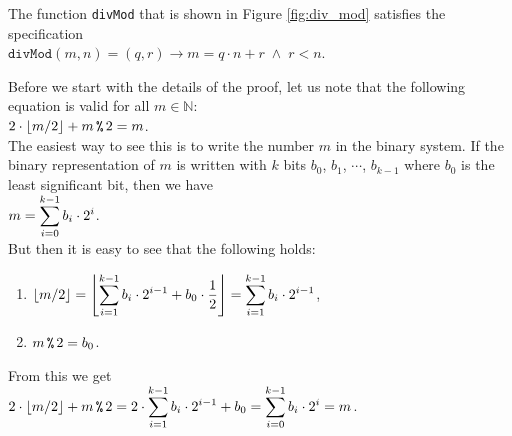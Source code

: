 \exampleEng
The function \texttt{divMod} that is shown in Figure \ref{fig:div_mod} satisfies the specification
\\[0.2cm]
\hspace*{1.3cm}
$\mathtt{divMod}(m, n) = (q, r)  \rightarrow m = q \cdot n + r \;\wedge\; r < n$. \eox



\proof
Before we start with the details of the proof, let us note that the following equation is valid for all $m\in\mathbb{N}$:
\\[0.2cm]
\hspace*{1.3cm}
$2 \cdot \lfloor m / 2 \rfloor + m \,\texttt{\%}\, 2 = m$.
\\[0.2cm]
The easiest way to see this is to write the number $m$ in the binary system.  If the binary representation of
$m$ is written with $k$ bits $b_0$, $b_1$, $\cdots$, $b_{k-1}$ where $b_0$ is the least significant bit, then we have
\\[0.2cm]
\hspace*{1.3cm}
$\displaystyle m = \sum\limits_{i=0}^{k-1} b_i \cdot 2^i$.
\\[0.2cm] 
But then it is easy to see that the following holds:
\begin{enumerate}
\item $\displaystyle \lfloor m / 2 \rfloor =
         \left\lfloor\sum\limits_{i=1}^{k-1} b_i \cdot 2^{i-1} + b_0 \cdot\frac{1}{2}\right\rfloor = 
         \sum\limits_{i=1}^{k-1} b_i \cdot 2^{i-1} $,
\item $m \,\texttt{\%}\, 2 = b_0$.
\end{enumerate}
From this we get
\\[0.2cm]
\hspace*{1.3cm}
$\displaystyle 2 \cdot \lfloor m / 2 \rfloor + m \,\texttt{\%}\, 2 = 2 \cdot \sum\limits_{i=1}^{k-1} b_i \cdot 2^{i-1} + b_0 =
\sum\limits_{i=0}^{k-1} b_i \cdot 2^i = m$.
\\[0.2cm]\mbox{}

